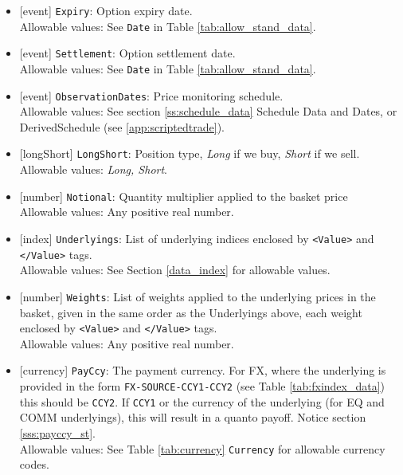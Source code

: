 \begin{itemize}
    \item{}[event] \lstinline!Expiry!: Option expiry date. \\
    Allowable values: See \lstinline!Date! in Table \ref{tab:allow_stand_data}.
    \item{}[event] \lstinline!Settlement!: Option settlement date. \\
    Allowable values: See \lstinline!Date! in Table \ref{tab:allow_stand_data}.
    \item{}[event] \lstinline!ObservationDates!: Price monitoring schedule. \\
    Allowable values: See section \ref{ss:schedule_data} Schedule Data and Dates, or DerivedSchedule (see \ref{app:scriptedtrade}).
    \item{}[longShort] \lstinline!LongShort!: Position type,
          {\em Long} if we buy, {\em Short} if we sell.\\
    Allowable values: \emph{Long, Short}.
    \item{}[number] \lstinline!Notional!: Quantity multiplier applied to the basket price \\
          Allowable values: Any positive real number.
    \item{}[index] \lstinline!Underlyings!: List of underlying indices
          enclosed by {\tt <Value>} and {\tt </Value>} tags. \\
          Allowable values: See Section \ref{data_index} for allowable values.
    \item{}[number] \lstinline!Weights!: List of weights applied to the
          underlying prices in the basket, given in the same order as
          the Underlyings above, each weight enclosed by {\tt <Value>} and {\tt </Value>} tags.\\
          Allowable values: Any positive real number.
    \item{}[currency] \lstinline!PayCcy!: The payment currency. For FX, where the underlying is provided
      in the form \lstinline!FX-SOURCE-CCY1-CCY2! (see Table \ref{tab:fxindex_data}) this should
      be \lstinline!CCY2!. If \lstinline!CCY1! or the currency of the underlying (for EQ and
      COMM underlyings), this will result in a quanto payoff. Notice section \ref{sss:payccy_st}. \\
        Allowable values: See Table \ref{tab:currency} \lstinline!Currency!  for allowable currency codes.
\end{itemize}

